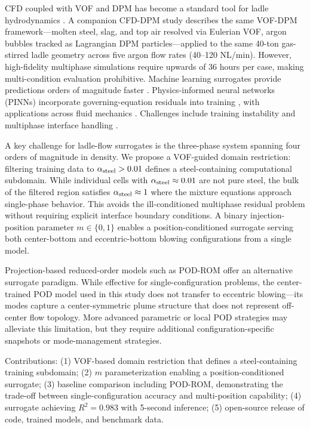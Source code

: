 \documentclass[12pt,a4paper]{article}
\begin{document}
CFD coupled with VOF and DPM has become a standard tool for ladle hydrodynamics \cite{liu2019numerical,ersson2008fluid,cloete2010mathematical}. A companion CFD-DPM study \cite{liu2026cfd} describes the same VOF-DPM framework---molten steel, slag, and top air resolved via Eulerian VOF, argon bubbles tracked as Lagrangian DPM particles---applied to the same 40-ton gas-stirred ladle geometry across five argon flow rates (40--120 NL/min). However, high-fidelity multiphase simulations require upwards of 36 hours per case, making multi-condition evaluation prohibitive. Machine learning surrogates provide predictions orders of magnitude faster \cite{brunton2020machine}. Physics-informed neural networks (PINNs) incorporate governing-equation residuals into training \cite{raissi2019physics,karniadakis2021physics}, with applications across fluid mechanics \cite{cai2021physics,cuomo2022scientific}. Challenges include training instability \cite{wang2021understanding} and multiphase interface handling \cite{jin2021nsfnet}.

A key challenge for ladle-flow surrogates is the three-phase system spanning four orders of magnitude in density. We propose a VOF-guided domain restriction: filtering training data to $\alpha_{\rm steel}>0.01$ defines a steel-containing computational subdomain. While individual cells with $\alpha_{\rm steel}\approx0.01$ are not pure steel, the bulk of the filtered region satisfies $\alpha_{\rm steel}\approx1$ where the mixture equations approach single-phase behavior. This avoids the ill-conditioned multiphase residual problem without requiring explicit interface boundary conditions. A binary injection-position parameter $m\in\{0,1\}$ enables a position-conditioned surrogate serving both center-bottom and eccentric-bottom blowing configurations from a single model.

Projection-based reduced-order models such as POD-ROM \cite{benner2015survey} offer an alternative surrogate paradigm. While effective for single-configuration problems, the center-trained POD model used in this study does not transfer to eccentric blowing---its modes capture a center-symmetric plume structure that does not represent off-center flow topology. More advanced parametric or local POD strategies may alleviate this limitation, but they require additional configuration-specific snapshots or mode-management strategies.

Contributions: (1) VOF-based domain restriction that defines a steel-containing training subdomain; (2) $m$ parameterization enabling a position-conditioned surrogate; (3) baseline comparison including POD-ROM, demonstrating the trade-off between single-configuration accuracy and multi-position capability; (4) surrogate achieving $R^{2}=0.983$ with 5-second inference; (5) open-source release of code, trained models, and benchmark data.
\end{document}
